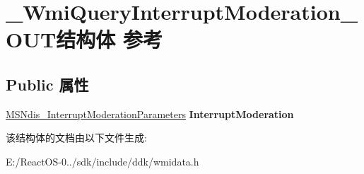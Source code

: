 \hypertarget{struct___wmi_query_interrupt_moderation___o_u_t}{}\section{\+\_\+\+Wmi\+Query\+Interrupt\+Moderation\+\_\+\+O\+U\+T结构体 参考}
\label{struct___wmi_query_interrupt_moderation___o_u_t}
\subsection*{Public 属性}
\begin{DoxyCompactItemize}
\item 
\mbox{\label{struct___wmi_query_interrupt_moderation___o_u_t_a2ebf44f8023687cb3ab0df8365bfb1e6}} 
\hyperlink{struct___m_s_ndis___interrupt_moderation_parameters}{M\+S\+Ndis\+\_\+\+Interrupt\+Moderation\+Parameters} {\bfseries Interrupt\+Moderation}
\end{DoxyCompactItemize}


该结构体的文档由以下文件生成\+:\begin{DoxyCompactItemize}
\item 
E\+:/\+React\+O\+S-\/0../sdk/include/ddk/wmidata.\+h\end{DoxyCompactItemize}
